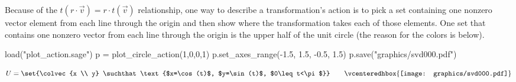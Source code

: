 Because of the $t(r\cdot\vec{v})=r\cdot t(\vec{v})$ relationship,
one way to describe a transformation's action is to pick 
a set containing one nonzero vector element from each line through the origin
and then show where the transformation takes each of 
those  elements.
One set that contains one nonzero vector from each line through the
origin is the upper half of the unit circle
(the reason for the colors is below).
\begin{sagesilent}
load("plot_action.sage")
p = plot_circle_action(1,0,0,1) 
p.set_axes_range(-1.5, 1.5, -0.5, 1.5) 
p.save("graphics/svd000.pdf")
\end{sagesilent}
\begin{equation*}
  U=\set{\colvec{x \\ y}
         \suchthat 
         \text{$x=\cos(t)$, $y=\sin(t)$, $0\leq t<\pi$}}
  \qquad
  \vcenteredhbox{\texttt{[image: graphics/svd000.pdf]}}  
\end{equation*}

